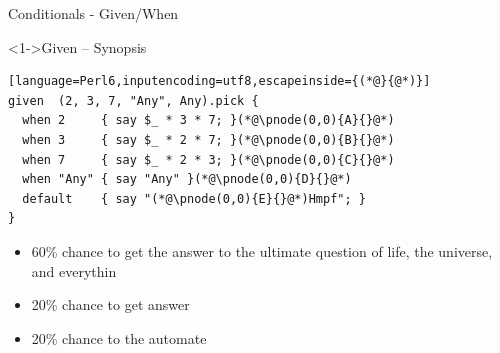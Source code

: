 \begin{frame}[fragile]{Conditionals - Given/When}
\begin{block}<1->{Given -- Synopsis}
\small
\begin{lstlisting}[language=Perl6,inputencoding=utf8,escapeinside={(*@}{@*)}]
given  (2, 3, 7, "Any", Any).pick {
  when 2     { say $_ * 3 * 7; }(*@\pnode(0,0){A}{}@*)
  when 3     { say $_ * 2 * 7; }(*@\pnode(0,0){B}{}@*)
  when 7     { say $_ * 2 * 3; }(*@\pnode(0,0){C}{}@*)
  when "Any" { say "Any" }(*@\pnode(0,0){D}{}@*)
  default    { say "(*@\pnode(0,0){E}{}@*)Hmpf"; }
}
\end{lstlisting}
\end{block}

\begin{itemize}
\item<2-> 60\% chance to get the answer to the ultimate question of life, the universe, and everythin
\item<3-> 20\% chance to get \textit{} answer
\item<4-> 20\% chance to  the automate
\end{itemize}
\end{frame}

